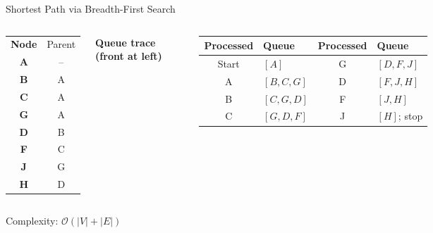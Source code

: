 \documentclass[aspectratio=169]{beamer}
\begin{document}
\begin{frame}{Shortest Path via Breadth-First Search}
\begin{columns}[T]
\begin{columns}[T,onlytextwidth]
\begin{tabular}{>{\bfseries}c|c}
            \rowcolor{PrimaryDark}\color{white}Node & \color{white}Parent \\
            \rowcolor{AccentOrange!30} A & -- \\
            B & A \\
            \rowcolor{PrimaryLight!45} C & A \\
            \rowcolor{AccentOrange!30} G & A \\
            D & B \\
            \rowcolor{PrimaryLight!45} F & C \\
            \rowcolor{AccentOrange!30} J & G \\
            H & D
          \end{tabular}
      \end{columns}
      \vspace{0.25em}

      \centering\scriptsize
      \textbf{Queue trace (front at left)}\par\smallskip
      {\setlength{\tabcolsep}{2.5pt}
      \begin{tabular}{c l|c l}
        \toprule
        \textbf{Processed} & \textbf{Queue} & \textbf{Processed} & \textbf{Queue} \\
        \midrule
        Start & $[A]$       & G & $[D,F,J]$ \\
        A & $[B,C,G]$       & D & $[F,J,H]$ \\
        B & $[C,G,D]$       & F & $[J,H]$ \\
        C & $[G,D,F]$       & \cellcolor{AccentOrange!25}J & \cellcolor{AccentOrange!25}$[H]$; stop \\
        \bottomrule
      \end{tabular}}
  \end{columns}
  \vspace{-0.35em}
  \scriptsize
  \quad
  Complexity: $\mathcal{O}(|V|+|E|)$
\end{frame}
\end{document}

